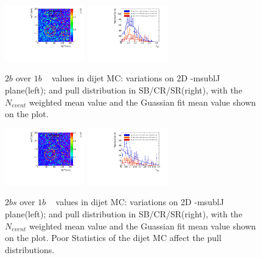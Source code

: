 \begin{figure}[htbp!]
\begin{center}
\includegraphics[width=0.31\textwidth,angle=-90]{figures/boosted/AppendixMuqcdstudy/QCD_TwoTag_Incl_mH0H1.pdf}
\includegraphics[width=0.31\textwidth,angle=-90]{figures/boosted/AppendixMuqcdstudy/QCD_TwoTag_Incl_mH0H1_pull.pdf}
\caption{$2b$ over $1b$ \muqcd~ values in dijet MC: \muqcd variations on 2D \mleadJ-msublJ plane(left); and \muqcd pull distribution in SB/CR/SR(right), with the $N_{event}$ weighted mean value and the Guassian fit mean value shown on the plot.}
\label{fig:app-muqcd-2b-qcd}
\end{center}
\end{figure}

\begin{figure}[htbp!]
\begin{center}
\includegraphics[width=0.31\textwidth,angle=-90]{figures/boosted/AppendixMuqcdstudy/QCD_TwoTag_split_Incl_mH0H1.pdf}
\includegraphics[width=0.31\textwidth,angle=-90]{figures/boosted/AppendixMuqcdstudy/QCD_TwoTag_split_Incl_mH0H1_pull.pdf}
\caption{$2bs$ over $1b$ \muqcd~ values in dijet MC: \muqcd variations on 2D \mleadJ-msublJ plane(left); and \muqcd pull distribution in SB/CR/SR(right), with the $N_{event}$ weighted mean value and the Guassian fit mean value shown on the plot. Poor Statistics of the dijet MC affect the pull distributions.}
\label{fig:app-muqcd-2bs-qcd}
\end{center}
\end{figure}


